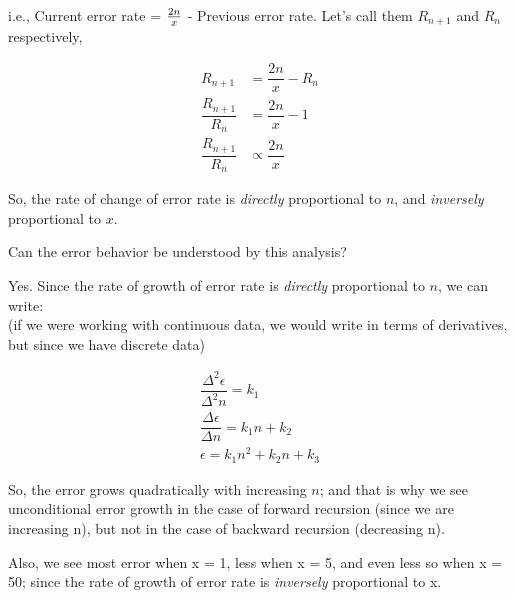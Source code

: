 \documentclass[12pt,letterpaper]{article}
\begin{document}
i.e., Current error rate = $2n\over x$ - Previous error rate. Let's call them $R_{n+1}$ and $R_n$ respectively,

\begin{align*}
R_{n+1} &= \dfrac{2n}{x} - R_n \\
\dfrac{R_{n+1}}{R_n} &= \dfrac{2n}{x} - 1 \\
\dfrac{R_{n+1}}{R_n} &\propto \dfrac{2n}{x}
\end{align*}

So, the rate of change of error rate is \emph{directly} proportional to $n$, and \emph{inversely} proportional to $x$.

\newpage

Can the error behavior be understood by this analysis? \par
Yes. Since the rate of growth of error rate is \emph{directly} proportional to $n$, we can write: \\
(if we were working with continuous data, we would write in terms of derivatives, but since we have discrete data)

\begin{align*}
\dfrac{\Delta^2 \epsilon}{\Delta^2 n} = k_1 \\
\dfrac{\Delta \epsilon}{\Delta n} = k_1n + k_2 \\
\epsilon = k_1 n^2 + k_2 n + k_3
\end{align*}

So, the error grows quadratically with increasing $n$; and that is why we see unconditional error growth in the case of forward recursion (since we are increasing n), but not in the case of backward recursion (decreasing n). \par
Also, we see most error when x = 1, less when x = 5, and even less so when x = 50; since the rate of growth of error rate is \emph{inversely} proportional to x.
\end{document}
